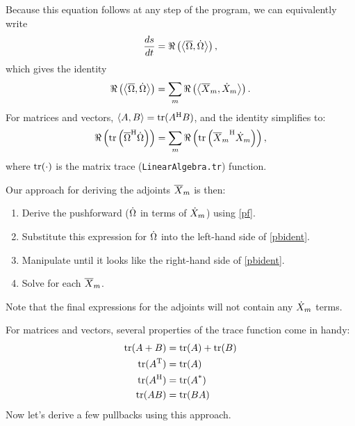 \documentclass[../main.tex]{subfiles}
\begin{document}
\begin{refsection}
Because this equation follows at any step of the program, we can equivalently write
\[\frac{ds}{dt} = \Re\left( \left\langle  \overline{\Omega} ,  \dot{\Omega}  \right\rangle \right),\]
which gives the identity
\begin{equation} \label{pbident}
\Re\left( \left\langle  \overline{\Omega} ,  \dot{\Omega}  \right\rangle \right) = 
\sum_m \Re\left( \left\langle  \overline{X}_m,  \dot{X}_m  \right\rangle \right).
\end{equation}
For matrices and vectors, $\left\langle A, B \right\rangle = \operatorname{tr}({A}^\mathrm{H} B)$, and the identity simplifies to:
\begin{equation} \label{pbidentmat}
\Re\left( \operatorname{tr}\left(
    {\overline{\Omega}}^\mathrm{H} \dot{\Omega}
\right) \right) =
\sum_m \Re \left( \operatorname{tr} \left(
    {\overline{X}_m}^\mathrm{H} \dot{X}_m
\right) \right),
\end{equation}
where $\operatorname{tr}(\cdot)$ is the matrix trace (\texttt{LinearAlgebra.tr}) function.

Our approach for deriving the adjoints $\overline{X}_m$ is then:
\begin{enumerate}
\def\labelenumi{\arabic{enumi}.}
\item
  Derive the pushforward ($\dot{\Omega}$ in terms of $\dot{X}_m$) using \eqref{pf}.
\item
  Substitute this expression for $\dot{\Omega}$ into the left-hand side of \eqref{pbident}.
\item
  Manipulate until it looks like the right-hand side of \eqref{pbident}.
\item
  Solve for each $\overline{X}_m$.
\end{enumerate}
Note that the final expressions for the adjoints will not contain any $\dot{X}_m$ terms.

For matrices and vectors, several properties of the trace function come in handy:
\begin{align}
\operatorname{tr}(A+B) &= \operatorname{tr}(A) + \operatorname{tr}(B) \label{trexpand}\\
\operatorname{tr}({A}^\mathrm{T}) &= \operatorname{tr}(A) \nonumber\\
\operatorname{tr}({A}^\mathrm{H}) &= {\operatorname{tr}(A}^*) \nonumber\\
\operatorname{tr}(AB) &= \operatorname{tr}(BA) \label{trperm}
\end{align}
Now let's derive a few pullbacks using this approach.


\end{refsection}
\end{document}
